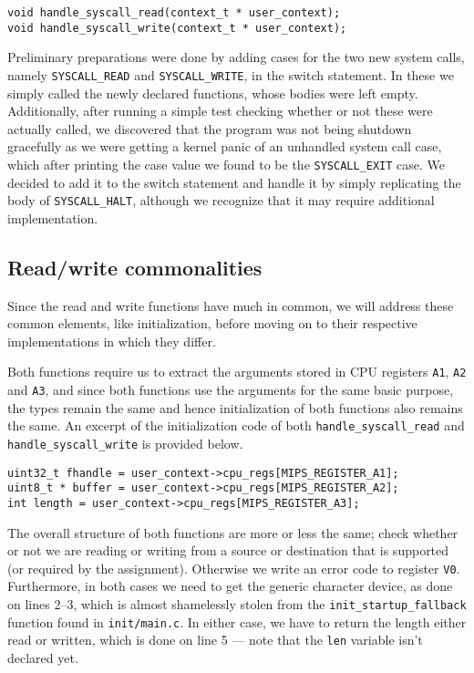 \documentclass[11pt]{article}
\newcommand{\code}[1]{{\tt #1}}
\newcommand{\file}[1]{{\tt #1}}
\begin{document}
\begin{lstlisting}
void handle_syscall_read(context_t * user_context);
void handle_syscall_write(context_t * user_context);
\end{lstlisting}

Preliminary preparations were done by adding cases for the two new system
calls, namely \code{SYSCALL\_READ} and \code{SYSCALL\_WRITE}, in the switch
statement. In these we simply called the newly declared functions, whose
bodies were left empty. Additionally, after running a simple test checking
whether or not these were actually called, we discovered that the program was
not being shutdown gracefully as we were getting a kernel panic of an
unhandled system call case, which after printing the case value we found to be
the \code{SYSCALL\_EXIT} case. We decided to add it to the switch statement
and handle it by simply replicating the body of \code{SYSCALL\_HALT}, although
we recognize that it may require additional implementation.

\subsection{Read/write commonalities}
Since the read and write functions have much in common, we will address these
common elements, like initialization, before moving on to their respective
implementations in which they differ.

Both functions require us to extract the arguments stored in CPU registers
\code{A1}, \code{A2} and \code{A3}, and since both functions use the arguments
for the same basic purpose, the types remain the same and hence initialization
of both functions also remains the same. An excerpt of the initialization code
of both \code{handle\_syscall\_read} and \code{handle\_syscall\_write} is
provided below.

\begin{lstlisting}
uint32_t fhandle = user_context->cpu_regs[MIPS_REGISTER_A1];
uint8_t * buffer = user_context->cpu_regs[MIPS_REGISTER_A2];
int length = user_context->cpu_regs[MIPS_REGISTER_A3];
\end{lstlisting}

The overall structure of both functions are more or less the same; check
whether or not we are reading or writing from a source or destination that is
supported (or required by the assignment). Otherwise we write an error code to
register \code{V0}. Furthermore, in both cases we need to get the generic
character device, as done on lines 2--3, which is almost shamelessly stolen
from the \code{init\_startup\_fallback} function found in \file{init/main.c}.
In either case, we have to return the length either read or written, which is
done on line 5 --- note that the \code{len} variable isn't declared yet.
\end{document}
